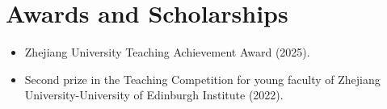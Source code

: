 \documentclass[11pt,a4paper,sans]{moderncv} %
\begin{document}
\section{Awards and Scholarships}
\begin{itemize}
  \item Zhejiang University Teaching Achievement Award (2025).
  \item Second prize in the Teaching Competition for young faculty of Zhejiang University-University of Edinburgh Institute (2022).
\end{itemize}

\vspace{0.1cm}
\end{document}

